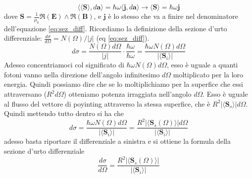 \documentclass[11pt,a4paper]{report}
\newcommand{\vettore}[1]{\mathbf{#1}}
\newcommand{\pscal}[2]{\langle #1,#2\rangle}
\newcommand{\pvet}[2]{#1\wedge #2}
\begin{document}
		\begin{equation}
			\pscal{\langle\vettore S \rangle}{d\vettore{a}}=\hbar \omega \pscal{\vettore j}{d\vettore a}
			\rightarrow
			\langle\vettore S\rangle= \hbar \omega\vettore j
		\end{equation}
		dove $\vettore S=\frac{1}{\mu_0}\pvet{\Re(\vettore E)}{\Re(\vettore B)}$, e $\vettore j$ è lo stesso che va a finire nel denominatore dell'equazione \ref{eq:sez_diff}.\newline
		Ricordiamo la definizione della sezione d'urto differenziale: $\frac{d\sigma}{d\Omega}=N(\Omega)/|j|$ (eq \ref{eq:sez_diff}).
		\[
			d\sigma=\frac{N(\Omega)d\Omega}{|j|}\cdot\frac{\hbar\omega}{\hbar \omega}=
			\frac{\hbar \omega N(\Omega)d\Omega}{|\langle \vettore S_i\rangle|}
		\]
		Adesso concentriamoci col significato di $\hbar \omega N(\Omega)d\Omega$, esso è uguale a quanti fotoni vanno nella direzione dell'angolo infinitesimo $d\Omega$ moltiplicato per la loro energia.\newline
		Quindi possiamo dire che se lo moltiplichiamo per la superfice che essi attraversano ($R^2d\Omega $) otteniamo potenza irraggiata nell'angolo $d\Omega$.\newline
		Esso è uguale al flusso del vettore di poyinting attraverso la stessa superfice, che è $R^2|\langle \vettore {S}_s \rangle |d\Omega $. Quindi mettendo tutto dentro si ha che
		\[
			d\sigma=\frac{\hbar \omega N(\Omega)d\Omega}{|\langle \vettore S_i\rangle|}=
			\frac{R^2|\langle \vettore S_s(\Omega) \rangle |d\Omega}{|\langle \vettore S_i\rangle|}
		\]
		adesso basta riportare il differenziale a sinistra e si ottiene la formula della sezione d'urto differenziale
		\begin{equation}
			\frac{d\sigma}{d\Omega}=\frac{R^2|\langle \vettore S_s(\Omega) \rangle |}{|\langle \vettore S_i\rangle|}
		\end{equation}
\end{document}
